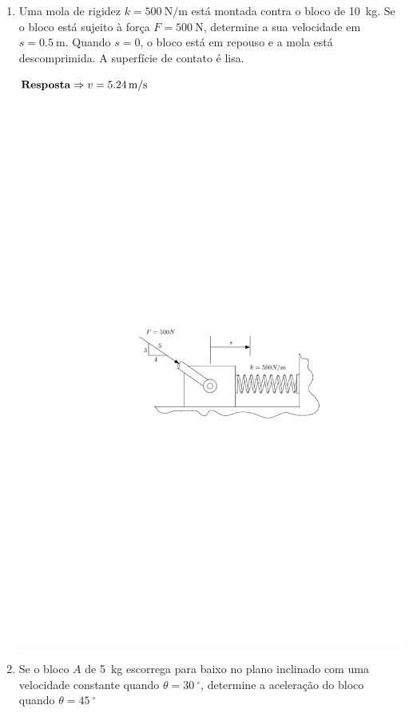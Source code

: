 \documentclass[a4paper,12pt]{article}
\begin{document}
	\begin{enumerate}
		\item Uma mola de rigidez $k=\SI{500}{\newton/\meter}$ está montada contra o bloco de \SI{10}{\kilogram}. Se o bloco está sujeito à força $F=\SI{500}{\newton}$, determine a sua velocidade em $s=\SI{0.5}{\meter}$. Quando $s=0$, o bloco está em repouso e a mola está descomprimida. A superfície de contato é lisa.
		
		$\textbf{\text{Resposta}}\Rightarrow v=\SI{5.24}{\meter/\second}$
		
		\begin{center}
			\includegraphics[scale=1.2]{images/draw_1.pdf}
		\end{center}
		
		\item Se o bloco $A$ de \SI{5}{\kilogram} escorrega para baixo no plano inclinado com uma velocidade constante quando $\theta=\SI{30}{^{\circ}}$, determine a aceleração do bloco quando $\theta=\SI{45}{^{\circ}}$
		

\end{enumerate}
\end{document}
